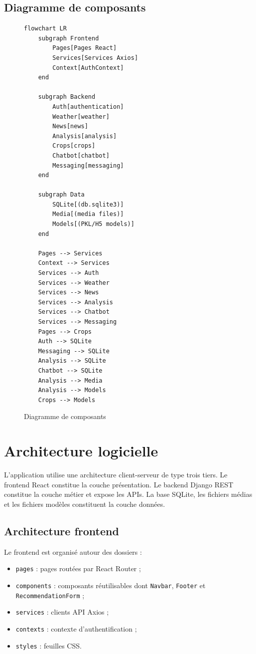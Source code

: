 \subsection{Diagramme de composants}
\begin{figure}[H]
\centering
\caption{Diagramme de composants}
\begin{lstlisting}[language=mermaid]
flowchart LR
    subgraph Frontend
        Pages[Pages React]
        Services[Services Axios]
        Context[AuthContext]
    end

    subgraph Backend
        Auth[authentication]
        Weather[weather]
        News[news]
        Analysis[analysis]
        Crops[crops]
        Chatbot[chatbot]
        Messaging[messaging]
    end

    subgraph Data
        SQLite[(db.sqlite3)]
        Media[(media files)]
        Models[(PKL/H5 models)]
    end

    Pages --> Services
    Context --> Services
    Services --> Auth
    Services --> Weather
    Services --> News
    Services --> Analysis
    Services --> Chatbot
    Services --> Messaging
    Pages --> Crops
    Auth --> SQLite
    Messaging --> SQLite
    Analysis --> SQLite
    Chatbot --> SQLite
    Analysis --> Media
    Analysis --> Models
    Crops --> Models
\end{lstlisting}
\end{figure}

\section{Architecture logicielle}
L'application utilise une architecture client-serveur de type trois tiers. Le frontend React constitue la couche présentation. Le backend Django REST constitue la couche métier et expose les APIs. La base SQLite, les fichiers médias et les fichiers modèles constituent la couche données.

\subsection{Architecture frontend}
Le frontend est organisé autour des dossiers :
\begin{itemize}[noitemsep]
  \item \texttt{pages} : pages routées par React Router ;
  \item \texttt{components} : composants réutilisables dont \texttt{Navbar}, \texttt{Footer} et \texttt{RecommendationForm} ;
  \item \texttt{services} : clients API Axios ;
  \item \texttt{contexts} : contexte d'authentification ;
  \item \texttt{styles} : feuilles CSS.
\end{itemize}

